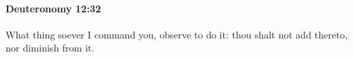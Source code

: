 
		\paragraph{Deuteronomy 12:32} %
			\label{DEUTERONOMY-12-32}

			What thing soever I command you, observe to do it: thou shalt not add thereto, nor diminish from it.

